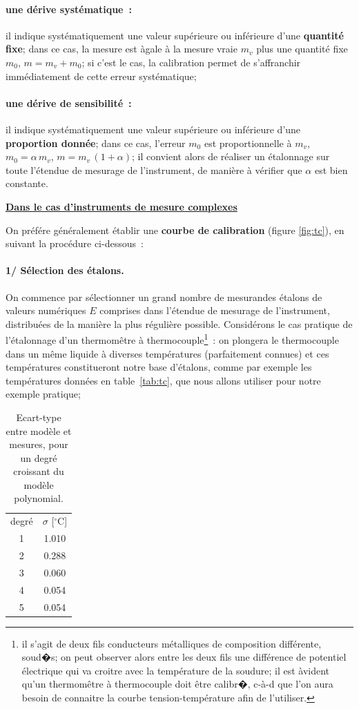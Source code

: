 \paragraph{une dérive systématique~:} il indique systématiquement une valeur supérieure ou inférieure d'une \textbf{quantité fixe}; dans ce cas, la mesure est àgale à la mesure vraie $m_v$ plus une quantité fixe $m_0$, $m=m_v+m_0$; si c'est le cas, la calibration permet de s'affranchir immédiatement de cette erreur systématique;
\paragraph{une dérive de sensibilité~:} il indique systématiquement une valeur supérieure ou inférieure d'une \textbf{proportion donnée}; dans ce cas, l'erreur $m_0$ est proportionnelle à $m_v$, $m_0=\alpha\,m_v$, $m=m_v\,(1+\alpha)$; il convient alors de réaliser un étalonnage sur toute l'étendue de mesurage de l'instrument, de manière à vérifier que $\alpha$ est bien constante.

\begin{flushleft}
\underline{\textbf{Dans le cas d'instruments de mesure complexes}}
\end{flushleft}
On préfére généralement établir une \textbf{courbe de calibration} (figure \ref{fig:tc}), en suivant la procédure ci-dessous~:
\paragraph{1/ Sélection des étalons.} On commence par sélectionner un grand nombre de mesurandes étalons de valeurs numériques $E$ comprises dans l'étendue de mesurage de l'instrument, distribuées de la manière la plus régulière possible. Considérons le cas pratique de l'étalonnage d'un thermomêtre à thermocouple\footnote{il s'agit de deux fils conducteurs métalliques de composition différente, soud�s; on peut observer alors entre les deux fils une différence de potentiel électrique qui va croitre avec la température de la soudure; il est àvident qu'un thermomêtre à thermocouple doit être calibr�, c-à-d que l'on aura besoin de connaitre la courbe tension-température afin de l'utiliser.}~: on plongera le thermocouple dans un même liquide à diverses températures (parfaitement connues) et ces températures constitueront notre base d'étalons, comme par exemple les températures données en table~\ref{tab:tc}, que nous allons utiliser pour notre exemple pratique;
\begin{table}
\vspace{-3mm}
\caption{Ecart-type entre modèle et mesures, pour un degré croissant du modèle polynomial.}
\begin{center}
\begin{tabular}{c|c}
degré & $\sigma$ [$^\circ$C] \\
 1 &  1.010 \\
 2 &  0.288 \\
 3 &  0.060 \\
 4 &  0.054 \\
 5 &  0.054
 \end{tabular}
\end{center}
\label{tab:tc2}
\end{table}
